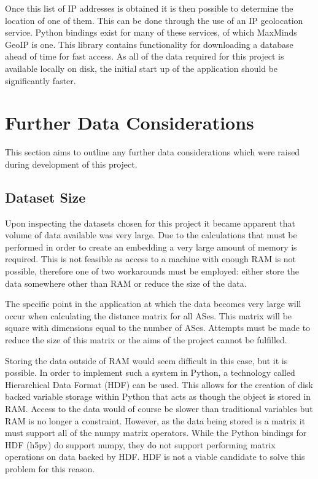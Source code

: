 Once this list of IP addresses is obtained it is then possible to determine the location of one of them. This can be done through the use of an IP geolocation service. Python bindings exist for many of these services, of which MaxMinds GeoIP \cite{python_geoip_2014} is one. This library contains functionality for downloading a database ahead of time for fast access. As all of the data required for this project is available locally on disk, the initial start up of the application should be significantly faster. 

\section{Further Data Considerations}

This section aims to outline any further data considerations which were raised during development of this project.

\subsection{Dataset Size}

Upon inspecting the datasets chosen for this project it became apparent that volume of data available was very large. Due to the calculations that must be performed in order to create an embedding a very large amount of memory is required. This is not feasible as access to a machine with enough RAM is not possible, therefore one of two workarounds must be employed: either store the data somewhere other than RAM or reduce the size of the data. 

The specific point in the application at which the data becomes very large will occur when calculating the distance matrix for all ASes. This matrix will be square with dimensions equal to the number of ASes. Attempts must be made to reduce the size of this matrix or the aims of the project cannot be fulfilled.

Storing the data outside of RAM would seem difficult in this case, but it is possible. In order to implement such a system in Python, a technology called Hierarchical Data Format (HDF) can be used. This allows for the creation of disk backed variable storage within Python that acts as though the object is stored in RAM. Access to the data would of course be slower than traditional variables but RAM is no longer a constraint. However, as the data being stored is a matrix it must support all of the numpy matrix operators. While the Python bindings for HDF (h5py) do support numpy, they do not support performing matrix operations on data backed by HDF. HDF is not a viable candidate to solve this problem for this reason.

